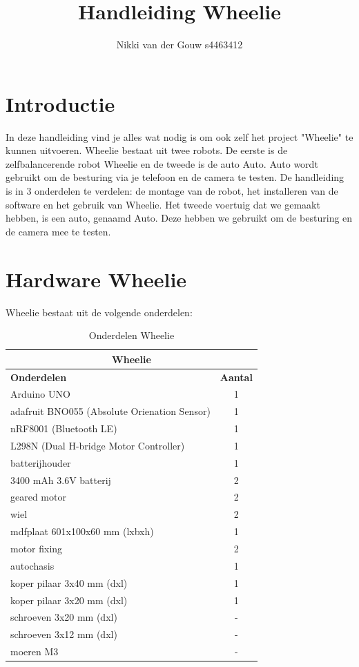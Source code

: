 \documentclass[12pt,a4paper]{article}
\author{Nikki van der Gouw s4463412}
\title{Handleiding Wheelie}
\begin{document}
\maketitle
\newpage
\tableofcontents
\newpage

\section{Introductie}
In deze handleiding vind je alles wat nodig is om ook zelf het project "Wheelie" te kunnen uitvoeren. Wheelie bestaat uit twee robots. De eerste is de zelfbalancerende robot Wheelie en de tweede is de auto Auto. Auto wordt gebruikt om de besturing via je telefoon en de camera te testen. De handleiding is in 3 onderdelen te verdelen: de montage van de robot, het installeren van de software en het gebruik van Wheelie. Het tweede voertuig dat we gemaakt hebben, is een auto, genaamd Auto. Deze hebben we gebruikt om de besturing en de camera mee te testen. 

\section{Hardware Wheelie}
Wheelie bestaat uit de volgende onderdelen:

\begin{table}[!h]	
	\begin{tabular}{|l|c|}
		\hline \multicolumn{2}{|c|}{\textbf{Wheelie}}	\\	
		\hline \textbf{Onderdelen} & \textbf{Aantal} \\ 
		\hline Arduino UNO & 1 \\ 
		\hline adafruit BNO055 (Absolute Orienation Sensor) & 1 \\ 
		\hline  nRF8001 (Bluetooth LE) & 1  \\ 
		\hline L298N (Dual H-bridge Motor Controller) & 1 \\
		\hline  batterijhouder & 1  \\ 
		\hline 3400 mAh 3.6V batterij & 2 \\ 
		\hline  geared motor & 2 \\
		\hline  wiel	 & 2 \\
		\hline 	mdfplaat 601x100x60 mm (lxbxh) & 1 \\
		\hline  motor fixing & 2 \\
		\hline  autochasis & 1 \\
		\hline	koper pilaar 3x40 mm (dxl) & 1 \\
		\hline 	koper pilaar 3x20 mm (dxl) & 1 \\
		\hline 	schroeven 3x20 mm (dxl) & - \\
		\hline 	schroeven 3x12 mm (dxl) & - \\
		\hline  moeren M3 & - \\
		\hline	
	\end{tabular} 
\caption{Onderdelen Wheelie}
\label{tbl:Onderdelen_wheelie}
\end{table}
\end{document}
